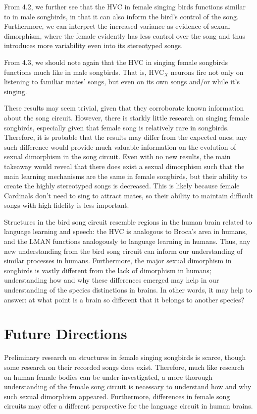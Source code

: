\documentclass[12pt]{article}
\begin{document}
From 4.2, we further see that the HVC in female singing birds functions similar to in male songbirds, in that it can also inform the bird's control of the song. Furthermore, we can interpret the increased variance as evidence of sexual dimorphism, where the female evidently has less control over the song and thus introduces more variability even into its stereotyped songs.

From 4.3, we should note again that the HVC in singing female songbirds functions much like in male songbirds. That is, HVC$_X$ neurons fire not only on listening to familiar mates' songs, but even on its own songs and/or while it's singing.

These results may seem trivial, given that they corroborate known information about the song circuit. However, there is starkly little research on singing female songbirds, especially given that female song is relatively rare in songbirds. Therefore, it is probable that the results may differ from the expected ones; any such difference would provide much valuable information on the evolution of sexual dimorphism in the song circuit. Even with no new results, the main takeaway would reveal that there does exist a sexual dimorphism such that the main learning mechanisms are the same in female songbirds, but their ability to create the highly stereotyped songs is decreased. This is likely because female Cardinals don't need to sing to attract mates, so their ability to maintain difficult songs with high fidelity is less important.

Structures in the bird song circuit resemble regions in the human brain related to language learning and speech: the HVC is analogous to Broca's area in humans, and the LMAN functions  analogously to language learning in humans. Thus, any new understanding from the bird song circuit can inform our understanding of similar processes in humans. Furthermore, the major sexual dimorphism in songbirds is vastly different from the lack of dimorphism in humans; understanding how and why these differences emerged may help in our understanding of the species distinctions in brains. In other words, it may help to answer: at what point is a brain so different that it belongs to another species?

\section{Future Directions}
Preliminary research on structures in female singing songbirds is scarce, though some research on their recorded songs does exist. Therefore, much like research on human female bodies can be under-investigated, a more thorough understanding of the female song circuit is necessary to understand how and why such sexual dimorphism appeared. Furthermore, differences in female song circuits may offer a different perspective for the language circuit in human brains.
\end{document}
